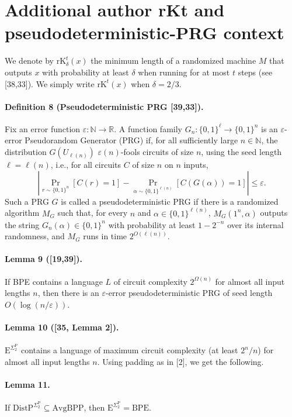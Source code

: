 \documentclass[10pt,a4paper]{article}
\begin{document}
\section*{Additional author rKt and pseudodeterministic-PRG context}
We denote by $\mathrm{rK}_\delta^t(x)$ the minimum length of a randomized machine $M$ that outputs $x$ with probability at least $\delta$ when running for at most $t$ steps (see [38,33]). We simply write $\mathrm{rK}^t(x)$ when $\delta=2/3$.
\paragraph{Definition 8 (Pseudodeterministic PRG [39,33]).} Fix an error function $\varepsilon:\mathbb N\to\mathbb R$. A function family $G_n:\{0,1\}^\ell\to\{0,1\}^n$ is an $\varepsilon$-error Pseudorandom Generator (PRG) if, for all sufficiently large $n\in\mathbb N$, the distribution $G(U_{\ell(n)})$ $\varepsilon(n)$-fools circuits of size $n$, using the seed length $\ell=\ell(n)$, i.e., for all circuits $C$ of size $n$ on $n$ inputs,
\[\left|\Pr_{r\sim\{0,1\}^n}[C(r)=1]-\Pr_{\alpha\sim\{0,1\}^{\ell(n)}}[C(G(\alpha))=1]\right|\leq\varepsilon.\]
Such a PRG $G$ is called a pseudodeterministic PRG if there is a randomized algorithm $M_G$ such that, for every $n$ and $\alpha\in\{0,1\}^{\ell(n)}$, $M_G(1^n,\alpha)$ outputs the string $G_n(\alpha)\in\{0,1\}^n$ with probability at least $1-2^{-n}$ over its internal randomness, and $M_G$ runs in time $2^{O(\ell(n))}$.
\paragraph{Lemma 9 ([19,39]).} If BPE contains a language $L$ of circuit complexity $2^{\Omega(n)}$ for almost all input lengths $n$, then there is an $\varepsilon$-error pseudodeterministic PRG of seed length $O(\log(n/\varepsilon))$.
\paragraph{Lemma 10 ([35, Lemma 2]).} $\mathrm E^{\Sigma_2^{\mathrm P}}$ contains a language of maximum circuit complexity (at least $2^n/n$) for almost all input lengths $n$.
Using padding as in [2], we get the following.
\paragraph{Lemma 11.} If $\mathrm{DistP}^{\Sigma_2^{\mathrm P}}\subseteq\mathrm{AvgBPP}$, then $\mathrm E^{\Sigma_2^{\mathrm P}}=\mathrm{BPE}$.
\end{document}
